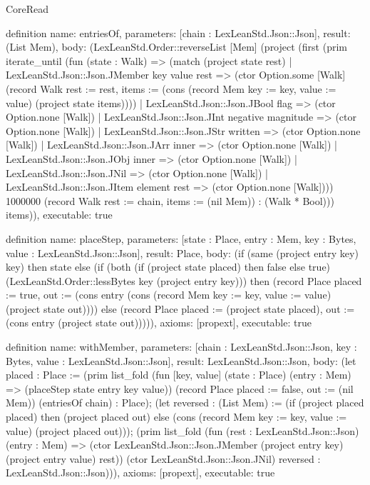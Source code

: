 \begin{lexlean}{CoreRead}
\begin{semanticmodule}
definition{
  name: entriesOf,
  parameters: [chain : LexLeanStd.Json::Json],
  result: (List Mem),
  body: (LexLeanStd.Order::reverseList [Mem] (project (first (prim iterate_until (fun (state : Walk) => (match (project state rest)
    | LexLeanStd.Json::Json.JMember key value rest => (ctor Option.some [Walk] (record Walk {rest := rest, items := (cons (record Mem {key := key, value := value}) (project state items))}))
    | LexLeanStd.Json::Json.JBool flag => (ctor Option.none [Walk])
    | LexLeanStd.Json::Json.JInt negative magnitude => (ctor Option.none [Walk])
    | LexLeanStd.Json::Json.JStr written => (ctor Option.none [Walk])
    | LexLeanStd.Json::Json.JArr inner => (ctor Option.none [Walk])
    | LexLeanStd.Json::Json.JObj inner => (ctor Option.none [Walk])
    | LexLeanStd.Json::Json.JNil => (ctor Option.none [Walk])
    | LexLeanStd.Json::Json.JItem element rest => (ctor Option.none [Walk]))) 1000000 (record Walk {rest := chain, items := (nil Mem)}) : (Walk * Bool))) items)),
  executable: true
}

definition{
  name: placeStep,
  parameters: [state : Place, entry : Mem, key : Bytes, value : LexLeanStd.Json::Json],
  result: Place,
  body: (if (same (project entry key) key) then state else (if (both (if (project state placed) then false else true) (LexLeanStd.Order::lessBytes key (project entry key))) then (record Place {placed := true, out := (cons entry (cons (record Mem {key := key, value := value}) (project state out)))}) else (record Place {placed := (project state placed), out := (cons entry (project state out))}))),
  axioms: [propext],
  executable: true
}

definition{
  name: withMember,
  parameters: [chain : LexLeanStd.Json::Json, key : Bytes, value : LexLeanStd.Json::Json],
  result: LexLeanStd.Json::Json,
  body: (let placed : Place := (prim list_fold (fun [key, value] (state : Place) (entry : Mem) => (placeStep state entry key value)) (record Place {placed := false, out := (nil Mem)}) (entriesOf chain) : Place); (let reversed : (List Mem) := (if (project placed placed) then (project placed out) else (cons (record Mem {key := key, value := value}) (project placed out))); (prim list_fold (fun (rest : LexLeanStd.Json::Json) (entry : Mem) => (ctor LexLeanStd.Json::Json.JMember (project entry key) (project entry value) rest)) (ctor LexLeanStd.Json::Json.JNil) reversed : LexLeanStd.Json::Json))),
  axioms: [propext],
  executable: true
}


\end{semanticmodule}
\end{lexlean}
